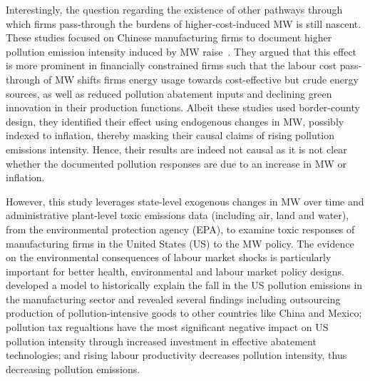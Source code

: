 \documentclass[authoryear, preprint, twocolumn, 1p]{elsarticle}
\begin{document}
    Interestingly, the question regarding the existence of other pathways through which firms pass-through the burdens of higher-cost-induced MW is still nascent. These studies focused on Chinese manufacturing firms to document higher pollution emission intensity induced by MW raise~\citep{li2023does, zhang2023unintended}. They argued that this effect is more prominent in financially constrained firms such that the labour cost pass-through of MW shifts firms energy usage towards cost-effective but crude energy sources, as well as reduced pollution abatement inputs and declining green innovation in their production functions. Albeit these studies used border-county design, they identified their effect using endogenous changes in MW, possibly indexed to inflation, thereby masking their causal claims of rising pollution emissions intensity. Hence, their results are indeed not causal as it is not clear whether the documented pollution responses are due to an increase in MW or inflation.

    However, this study leverages state-level exogenous changes in MW over time and administrative plant-level toxic emissions data (including air, land and water), from the environmental protection agency (EPA), to examine toxic responses of manufacturing firms in the United States (US) to the MW policy. The evidence on the environmental consequences of labour market shocks is particularly important for better health, environmental and labour market policy designs.~\citet{shapiro2018pollution} developed a model to historically explain the fall in the US pollution emissions in the manufacturing sector and revealed several findings including outsourcing production of pollution-intensive goods to other countries like China and Mexico; pollution tax regualtions have the most significant negative impact on US pollution intensity through increased investment in effective abatement technologies; and rising labour productivity decreases pollution intensity, thus decreasing pollution emissions.

\end{document}
